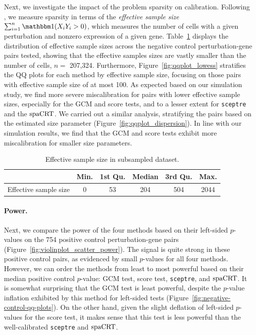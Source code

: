 \documentclass[12pt]{article}
\theoremstyle{definition}
\newcommand{\indicator}{\mathbbm 1}						%
\newcommand{\spacrt}{\textnormal{spaCRT}}               %
\begin{document}
Next, we investigate the impact of the problem sparsity on calibration. Following \citep{Barry2024}, we measure sparsity in terms of the \textit{effective sample size} $\sum_{i = 1}^n \indicator(X_i Y_i > 0)$, which measures the number of cells with a given perturbation and nonzero expression of a given gene. Table~\ref{tab:sparsity_level_ess} displays the distribution of effective sample sizes across the negative control perturbation-gene pairs tested, showing that the effective samples sizes are vastly smaller than the number of cells, $n =$ 207,324. Furthermore, Figure~\ref{fig:qqplot_lowess} stratifies the QQ plots for each method by effective sample size, focusing on those pairs with effective sample size of at most 100. As expected based on our simulation study, we find more severe miscalibration for pairs with lower effective sample sizes, especially for the GCM and score tests, and to a lesser extent for \verb|sceptre| and the $\spacrt$. We carried out a similar analysis, stratifying the pairs based on the estimated size parameter (Figure~\ref{fig:qqplot_dispersion}). In line with our simulation results, we find that the GCM and score tests exhibit more miscalibration for smaller size parameters. 


\begin{table}[h!]
  \centering
  \begin{tabular}[t]{lccccc}
  \toprule
    & Min. & 1st Qu. & Median & 3rd Qu. & Max.\\
  \midrule
  Effective sample size & 0   &   53   &  204  &   504  & 2044 \\
  \bottomrule
  \end{tabular}
  \caption{Effective sample size in subsampled dataset.}
  \label{tab:sparsity_level_ess}
\end{table}

\paragraph{Power.}

Next, we compare the power of the four methods based on their left-sided $p$-values on the 754 positive control perturbation-gene pairs (Figure~\ref{fig:violinplot_scatter_power}). The signal is quite strong in these positive control pairs, as evidenced by small $p$-values for all four methods. However, we can order the methods from least to most powerful based on their median positive control $p$-value: GCM test, score test, \verb|sceptre|, and $\spacrt$. It is somewhat surprising that the GCM test is least powerful, despite the $p$-value inflation exhibited by this method for left-sided tests (Figure~\ref{fig:negative-control-qq-plots}). On the other hand, given the slight deflation of left-sided $p$-values for the score test, it makes sense that this test is less powerful than the well-calibrated \verb|sceptre| and $\spacrt$.
\end{document}
